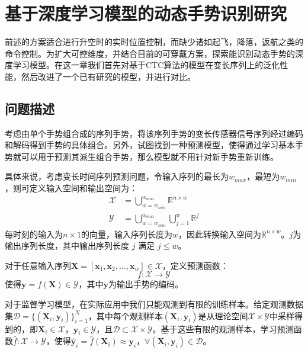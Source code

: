\ifx\allfiles\undefined


\else
\fi

\section{基于深度学习模型的动态手势识别研究}

前述的方案适合进行升空时的实时位置控制，而缺少诸如起飞，降落，返航之类的命令控制。为扩大可控维度，并结合目前的可穿戴方案，探索能识别动态手势的深度学习模型。在这一章我们首先对基于CTC算法的模型在变长序列上的泛化性能，然后改进了一个已有研究的模型，并进行对比。

\subsection{问题描述}

考虑由单个手势组合成的序列手势，将该序列手势的变长传感器信号序列经过编码和解码得到手势的具体组合。另外，试图找到一种预测模型，使得通过学习基本手势就可以用于预测其派生组合手势，那么模型就不用针对新手势重新训练。

具体来说，考虑变长时间序列预测问题，令输入序列的最长为$w_{max}$，最短为$w_{min}$，则可定义输入空间和输出空间为：
\begin{align}
\mathcal{X} &= \bigcup_{w=w_{min}}^{w_{max}} \mathbb{R}^{n \times w}\\
\mathcal{Y} &= \bigcup_{w=w_{min}}^{w_{max}} \bigcup_{j=1}^{w} \mathbb{R}^{j}
\end{align}
每时刻的输入为$n\times 1$的向量，输入序列长度为$w$，因此转换输入空间为$\mathbb{R}^{n \times w}$。$j$为输出序列长度，其中输出序列长度 $j$ 满足 $j \leq w$。

对于任意输入序列$\mathbf{X} = [\mathbf{x}_1, \mathbf{x}_2, \ldots, \mathbf{x}_w] \in \mathcal{X}$，定义预测函数：
$$f: \mathcal{X} \rightarrow \mathcal{Y}$$
使得$\mathbf{y} = f(\mathbf{X}) \in \mathcal{Y}$，其中$\mathbf{y}$为输出手势的编码。

对于监督学习模型，在实际应用中我们只能观测到有限的训练样本。给定观测数据集$\mathcal{D} =\{(\mathbf{X}_i, \mathbf{y}_i)\}_{i=1}^N$，其中每个观测样本$(\mathbf{X}_i, \mathbf{y}_i)$是从理论空间$\mathcal{X} \times \mathcal{Y}$中采样得到的，即$\mathbf{X}_i \in \mathcal{X}$，$\mathbf{y}_i \in \mathcal{Y}$，且$\mathcal{D} \subset \mathcal{X} \times \mathcal{Y}$。基于这些有限的观测样本，学习预测函数$\hat{f}: \mathcal{X} \rightarrow \mathcal{Y}$，使得$\hat{\mathbf{y}}_i=\hat{f}(\mathbf{X}_i)\approx\mathbf{y}_i$，$\forall (\mathbf{X}_i, \mathbf{y}_i) \in \mathcal{D}$。

